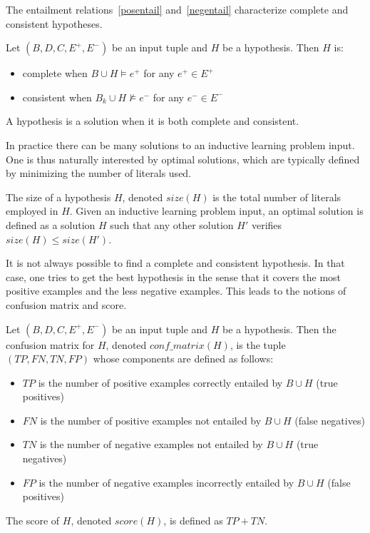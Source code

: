 The entailment relations~\ref{posentail} and~\ref{negentail} characterize complete and consistent hypotheses.

\begin{definition}
Let $(B, D, C, E^+, E^-)$ be an input tuple and $H$ be a hypothesis. Then $H$ is:

\begin{itemize}
    \item complete when \( B \cup H \models e^+\) for any  $e^+ \in E^+$
    \item consistent when \( B_k \cup H  \nvDash e^- \) for any $e^- \in E^-$ 
\end{itemize}

\noindent
A hypothesis is a solution when it is both complete and consistent.
\end{definition}

In practice there can be many solutions to an inductive learning
problem input. One is thus naturally interested by optimal solutions,
which are typically defined by minimizing the number of literals used.

\begin{definition}
The size of a hypothesis $H$, denoted $size(H)$ is the total number of literals
employed in $H$. Given an inductive learning problem input, an optimal solution is defined as
a solution $H$ such that any other solution $H'$ verifies $size(H) \leq size(H')$.
\end{definition}

It is not always possible to find a complete and consistent
hypothesis. In that case, one tries to get the best hypothesis in the
sense that it covers the most positive examples and the less negative examples. This leads to the notions of confusion matrix and score.

\begin{definition}
\label{confusion-matrix}
Let $(B, D, C, E^+, E^-)$ be an input tuple and $H$ be a
hypothesis. Then the confusion matrix for $H$, denoted
$conf\_matrix(H)$, is the tuple $(TP,FN,TN,FP)$ whose components are defined as follows:

\begin{itemize}

\item $TP$ is the number of positive examples correctly entailed by $B \cup H$ (true positives) 
\item $FN$ is the number of positive examples not entailed by $B \cup H$ (false negatives) 
\item $TN$ is the number of negative examples not entailed by $B \cup H$ (true negatives)
\item $FP$ is the number of negative examples incorrectly entailed by $B \cup H$ (false positives)

\end{itemize}

\noindent
The score of $H$, denoted $score(H)$, is defined as $TP + TN$.
\end{definition}

